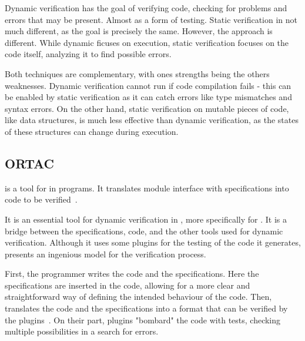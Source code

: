 Dynamic verification has the goal of verifying code, checking for problems and errors 
that may be present. Almost as a form of testing. Static verification in not much different, 
as the goal is precisely the same. However, the approach is different. While dynamic ficuses 
on execution, static verification focuses on the code itself, analyzing it to find possible 
errors. 

Both techniques are complementary, with ones strengths being the others weaknesses.
Dynamic verification cannot run if code compilation fails - this can be enabled by static 
verification as it can catch errors like type mismatches and syntax errors. On the other hand, 
static verification on mutable pieces of code, like data structures, is much less effective 
than dynamic verification, as the states of these structures can change during execution.

\subsection{ORTAC}
\label{sub:ortac}

\ortac is a tool for \rac in \ocaml programs. It translates \ocaml module interface with 
\gospellang specifications into code to be verified~\cite{Filliatre}.

It is an essential tool for dynamic verification in \ocaml, more specifically for 
\rac. It is a bridge between the \gospellang specifications, \ocaml code, and the other tools 
used for dynamic verification. Although it uses some plugins for the testing of the code it 
generates, \ortac presents an ingenious model for the verification process.

First, the programmer writes the \ocaml code and the \gospellang specifications. Here the 
specifications are inserted in the code, allowing for a more clear and straightforward 
way of defining the intended behaviour of the code. Then, \ortac translates the code 
and the specifications into a format that can be verified by the plugins~\cite{Filliatre}. 
On their part, plugins "bombard" the code with tests, checking multiple possibilities in a 
search for errors.